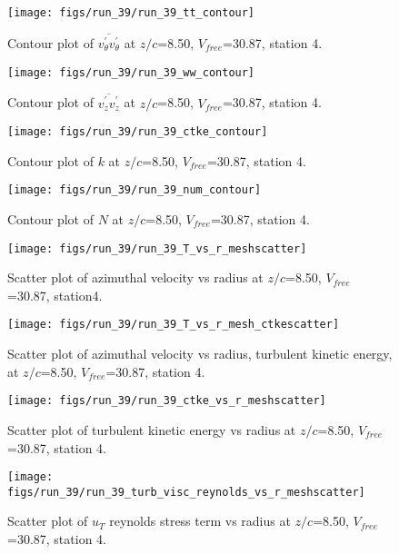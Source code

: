 \begin{figure}[H]
\centering
\texttt{[image: figs/run\_39/run\_39\_tt\_contour]}
\caption{Contour plot of $\overline{v_{\theta}^{\prime} v_{\theta}^{\prime}}$ at $z/c$=8.50, $V_{free}$=30.87, station 4.}
\end{figure}


\begin{figure}[H]
\centering
\texttt{[image: figs/run\_39/run\_39\_ww\_contour]}
\caption{Contour plot of $\overline{v_{z}^{\prime} v_{z}^{\prime}}$ at $z/c$=8.50, $V_{free}$=30.87, station 4.}
\end{figure}


\begin{figure}[H]
\centering
\texttt{[image: figs/run\_39/run\_39\_ctke\_contour]}
\caption{Contour plot of $k$ at $z/c$=8.50, $V_{free}$=30.87, station 4.}
\end{figure}


\begin{figure}[H]
\centering
\texttt{[image: figs/run\_39/run\_39\_num\_contour]}
\caption{Contour plot of $N$ at $z/c$=8.50, $V_{free}$=30.87, station 4.}
\end{figure}


\begin{figure}[H]
\centering
\texttt{[image: figs/run\_39/run\_39\_T\_vs\_r\_meshscatter]}
\caption{Scatter plot of azimuthal velocity vs radius at $z/c$=8.50, $V_{free}$=30.87, station4.}
\end{figure}


\begin{figure}[H]
\centering
\texttt{[image: figs/run\_39/run\_39\_T\_vs\_r\_mesh\_ctkescatter]}
\caption{Scatter plot of azimuthal velocity vs radius, turbulent kinetic energy, at $z/c$=8.50, $V_{free}$=30.87, station 4.}
\end{figure}


\begin{figure}[H]
\centering
\texttt{[image: figs/run\_39/run\_39\_ctke\_vs\_r\_meshscatter]}
\caption{Scatter plot of turbulent kinetic energy vs radius at $z/c$=8.50, $V_{free}$=30.87, station 4.}
\end{figure}


\begin{figure}[H]
\centering
\texttt{[image: figs/run\_39/run\_39\_turb\_visc\_reynolds\_vs\_r\_meshscatter]}
\caption{Scatter plot of $
u_T$ reynolds stress term vs radius at $z/c$=8.50, $V_{free}$=30.87, station 4.}
\end{figure}



